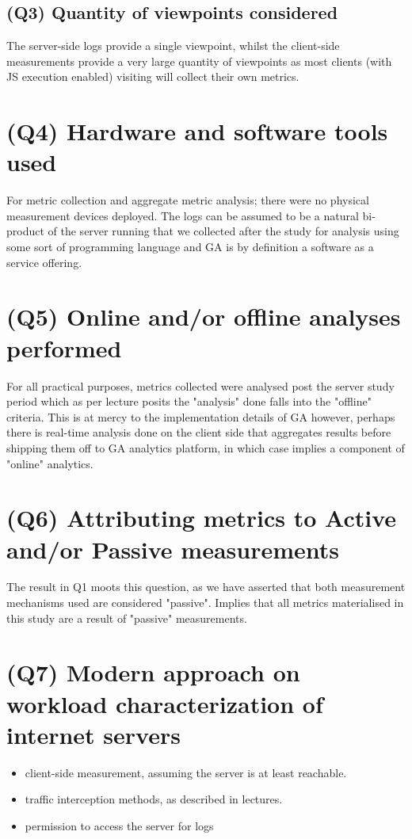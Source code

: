 \documentclass{article}
\begin{document}
\subsection*{(Q3) Quantity of viewpoints considered}
The server-side logs provide a single viewpoint, whilst the client-side measurements provide a very large quantity of viewpoints as most clients (with JS execution enabled) visiting will collect their own metrics.

\section*{(Q4) Hardware and software tools used}
For metric collection and aggregate metric analysis; there were no physical measurement devices deployed. The logs can be assumed to be a natural bi-product of the server running that we collected after the study for analysis using some sort of programming language and GA is by definition a software as a service offering.
 

\section*{(Q5) Online and/or offline analyses performed}
For all practical purposes, metrics collected were analysed post the server study period which as per lecture posits the "analysis" done falls into the "offline" criteria. This is at mercy to the implementation details of GA however, perhaps there is real-time analysis done on the client side that aggregates results before shipping them off to GA analytics platform, in which case implies a component of "online" analytics.

\section*{(Q6) Attributing metrics to Active and/or Passive measurements}
The result in Q1 moots this question, as we have asserted that both measurement mechanisms used are considered "passive". Implies that all metrics materialised in this study are a result of "passive" measurements.

\section*{(Q7) Modern approach on workload characterization of internet servers}
\begin{itemize}
				\item client-side measurement, assuming the server is at least reachable.
				\item traffic interception methods, as described in lectures.
				\item permission to access the server for logs
\end{itemize}
\end{document}
